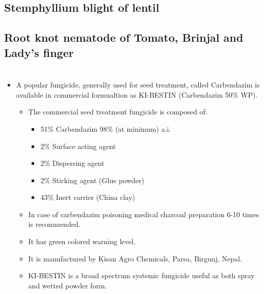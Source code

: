 \documentclass[
]{book}
\providecommand{\tightlist}{%
  \setlength{\itemsep}{0pt}\setlength{\parskip}{0pt}}
\begin{document}
\hypertarget{stemphyllium-blight-of-lentil}{%
\subsection{Stemphyllium blight of lentil}\label{stemphyllium-blight-of-lentil}}

\hypertarget{root-knot-nematode-of-tomato-brinjal-and-ladys-finger}{%
\subsection{Root knot nematode of Tomato, Brinjal and Lady's finger}\label{root-knot-nematode-of-tomato-brinjal-and-ladys-finger}}

\hypertarget{section}{%
\section{}\label{section}}

\begin{itemize}
\tightlist
\item
  A popular fungicide, generally used for seed treatment, called Carbendazim is available in commercial formualtion as KI-BESTIN (Carbendazim 50\% WP).

  \begin{itemize}
  \tightlist
  \item
    The commercial seed treatment fungicide is composed of:

    \begin{itemize}
    \tightlist
    \item
      51\% Carbendazim 98\% (at minimum) a.i.
    \item
      2\% Surface acting agent
    \item
      2\% Dispersing agent
    \item
      2\% Sticking agent (Glue powder)
    \item
      43\% Inert carrier (China clay)
    \end{itemize}
  \item
    In case of carbendazim poisoning medical charcoal preparation 6-10 times is recommended.
  \item
    It has green colored warning level.
  \item
    It is manufactured by Kisan Agro Chemicals, Parsa, Birgunj, Nepal.
  \item
    KI-BESTIN is a broad spectrum systemic fungicide useful as both spray and wetted powder form.
  \end{itemize}
\end{itemize}
\end{document}
